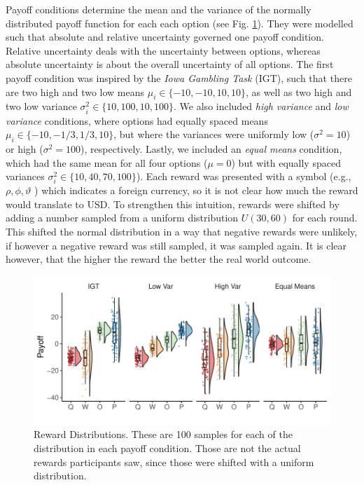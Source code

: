 Payoff conditions determine the mean and the variance of the normally distributed payoff function for each each option (see Fig. \ref{fig:RDistribution}). They were modelled such that absolute and relative uncertainty governed one payoff condition. Relative uncertainty deals with the uncertainty between options, whereas absolute uncertainty is about the overall uncertainty of all options.  
The first payoff condition was inspired by the \emph{Iowa Gambling Task} (IGT), such that there are two high and two low means $\mu_i\in \{-10, -10, 10, 10\}$, as well as two high and two low variance $\sigma^2_i\in \{10, 100, 10, 100\}$. 
We also included \emph{high variance} and \emph{low variance} conditions, where options had equally spaced means $\mu_i \in \{-10, -1/3, 1/3, 10\}$, but where the variances were uniformly low ($\sigma^2=10$) or high ($\sigma^2=100$), respectively. Lastly, we included an \emph{equal means} condition, which had the same mean for all four options ($\mu=0$) but with equally spaced variances $\sigma^2_i\in \{10,40, 70, 100\}$). 
Each reward was presented with a symbol (e.g., $\rho, \phi, \vartheta$ ) which indicates a foreign currency, so it is not clear how much the reward would translate to USD. To strengthen this intuition, rewards were shifted by adding a number sampled from a uniform distribution $U(30, 60)$ for each round. This shifted the normal distribution in a way that negative rewards were unlikely, if however a negative reward was still sampled, it was sampled again.  
It is clear however, that the higher the reward the better the real world outcome. 


\begin{figure}
    \centering
    \includegraphics{Plots/RewardDistributions2.pdf}
    \caption[Reward Distributions]{Reward Distributions. These are 100 samples for each of the distribution in each payoff condition. Those are not the actual rewards participants saw, since those were shifted with a uniform distribution.}
    \label{fig:RDistribution}
\end{figure}



